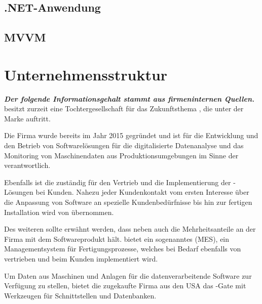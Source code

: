 \subsection{.NET-Anwendung}\label{sec:2_NET}

\subsection{MVVM}\label{sec:2_MVVM}




\newpage

\section{Unternehmensstruktur}\label{sec:2_Unternehmensstruktur}


\textit{\textbf{Der folgende Informationsgehalt stammt aus firmeninternen Quellen.}}\\

 besitzt zurzeit eine Tochtergesellschaft für das Zukunftsthema , die unter der Marke  auftritt.

Die Firma  wurde bereits im Jahr 2015 gegründet und ist für die Entwicklung und den Betrieb von Softwarelösungen für die digitalisierte Datenanalyse und das Monitoring von Maschinendaten aus Produktionsumgebungen im Sinne der  verantwortlich.

Ebenfalls ist die  zuständig für den Vertrieb und die Implementierung der -Lösungen bei Kunden. Nahezu jeder Kundenkontakt vom ersten Interesse über die Anpassung von Software an spezielle Kundenbedürfnisse bis hin zur fertigen Installation wird von  übernommen.

Des weiteren sollte erwähnt werden, dass  neben  auch die Mehrheitsanteile an der Firma  mit dem Softwareprodukt  hält.  bietet ein sogenanntes  (\acs{MES}), ein Managementsystem für Fertigungsprozesse, welches bei Bedarf ebenfalls von  vertrieben und beim Kunden implementiert wird. 

Um Daten aus Maschinen und Anlagen für die datenverarbeitende Software zur Verfügung zu stellen, bietet die zugekaufte Firma  aus den USA das -Gate mit Werkzeugen für Schnittstellen und Datenbanken.


\newpage










